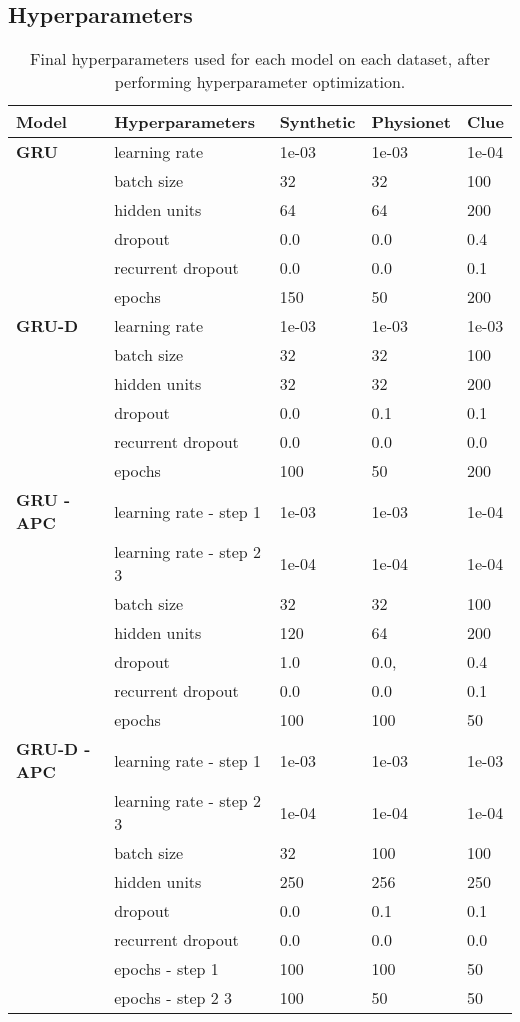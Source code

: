 \documentclass{article}
\begin{document}
\subsection{\large Hyperparameters}
\vspace{1cm}
\begin{table*}[h]
\caption{\label{tab:chosen_hyperparameters} Final hyperparameters used for each model on each dataset, after performing hyperparameter optimization.}
\centering
\setlength{\tabcolsep}{10pt}
\begin{tabular}{lllll}
\toprule
{\textbf{Model}} & {Hyperparameters} & {Synthetic} & {Physionet} & {Clue} \\
\midrule
{\textbf{GRU}} & learning rate & 1e-03 & 1e-03 &  1e-04    \\
 & batch size  & 32 &   32  &   100\\
 & hidden units & 64 & 64 &   200\\
 & dropout & 0.0 &  0.0 &  0.4 \\
 & recurrent dropout & 0.0 &  0.0 & 0.1 \\
 & epochs & 150 &  50 & 200\\
\hline
{\textbf{GRU-D}} & learning rate & 1e-03 &  1e-03 & 1e-03 \\
& batch size  & 32 & 32 &  100 \\
& hidden units & 32 & 32 &  200\\
& dropout & 0.0 &  0.1 & 0.1 \\
& recurrent dropout & 0.0 &  0.0 &  0.0\\
& epochs & 100 &  50 & 200\\
\hline
{\textbf{GRU - APC}} & learning rate - step 1 & 1e-03 &  1e-03 &  1e-04 \\
& learning rate - step 2  3 & 1e-04 & 1e-04 &  1e-04   \\
& batch size & 32 &   32 &  100 \\
& hidden units & 120 &   64 &  200 \\
& dropout & 1.0 & 0.0,  & 0.4 \\
& recurrent dropout & 0.0 &  0.0 &  0.1\\
& epochs & 100 &  100 & 50\\
\hline
{\textbf{GRU-D - APC}} & learning rate - step 1 & 1e-03 &  1e-03 & 1e-03  \\
& learning rate - step 2  3 & 1e-04 & 1e-04 & 1e-04  \\
& batch size & 32 &  100 &  100  \\
& hidden units & 250 &  256  &  250 \\
& dropout & 0.0 & 0.1 &  0.1 \\
& recurrent dropout & 0.0 &  0.0 & 0.0 \\
& epochs - step 1 & 100 &  100 & 50\\
& epochs - step 2  3 & 100 &  50  &  50\\
\bottomrule 
\end{tabular}
\end{table*}
\end{document}
